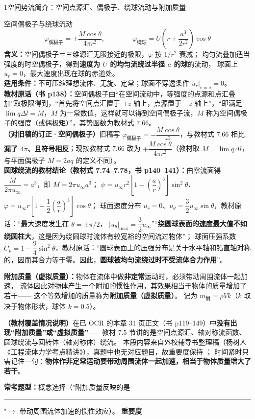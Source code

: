 \begin{kaodian}{1}{空间势流简介：空间点源汇、偶极子、绕球流动与附加质量}
\begin{gongshi}{空间偶极子与绕球流动}
\[ \varphi_{\text{偶极子}}=+\frac{M\cos\theta}{4\pi r^2},\qquad\qquad
   \varphi_{\text{绕球}}=U\left(r+\frac{a^3}{2r^2}\right)\cos\theta \]
\textbf{含义：}空间偶极子＝三维源汇无限接近的极限，$\varphi$ 按 $1/r^2$ 衰减；
均匀流叠加适当强度的时空偶极子，得到\textbf{速度为 $U$ 的均匀流绕过半径 $a$ 的球}的流动，
球面上 $u_r=0$，最大速度出现在球的赤道处。\\
\textbf{适用条件：}不可压缩理想流体、无旋、定常；球面不穿透条件 $u_r\big|_{r=a}=0$。\\
\textbf{教材原话（书 p138）：}空间偶极子由“在空间流动中，等强度的点源和点汇叠加”取极限得到，“首先将空间点汇置于 $+z$ 轴上，点源置于 $-z$ 轴上”，“即满足 $\lim q\Delta l=M$，$M$ 为一常数值，这样就可以得到空间偶极子流，$M$ 称为空间偶极子的强度（或偶极矩）”，其势函数为教材式 7.66。\\
\textbf{（对旧稿的订正·空间偶极子）}旧稿写 $\varphi_{\text{偶极子}}=-\dfrac{M\cos\theta}{r^2}$，与教材式 7.66 相比\textbf{漏了 $4\pi$、且符号相反}；现按教材式 7.66 改为 $+\dfrac{M\cos\theta}{4\pi r^2}$（教材取 $M=\lim q\Delta l$，与平面偶极子 $M=2aq$ 的定义不同）。\\
\textbf{圆球绕流的教材结论（教材式 7.74--7.78，书 p140--141）：}由零流面得 $\dfrac{M}{2\pi u_\infty}=a^3$，即 $M=2\pi u_\infty a^3$；
$\psi=u_\infty r^2\left[1-\left(\dfrac{a}{r}\right)^3\right]\sin^2\theta$、$\varphi=u_\infty r\left[1+\dfrac12\left(\dfrac{a}{r}\right)^3\right]\cos\theta$；
球面速度分布 $u_r=0$、$u_\theta=\dfrac32 u_\infty\sin\theta$，教材原话：“最大速度发生在 $\theta=\pm\pi/2$，
$|u_\theta|_{\max}=\dfrac32 u_\infty$”“\textbf{绕圆球表面的速度最大值不如绕圆柱大}，这是因为绕圆球时流体有较宽裕的空间流过物体”；
球面压强系数 $C_p=1-\dfrac94\sin^2\theta$，教材原话：“圆球表面上的压强分布是关于水平轴和铅直轴对称的，因而其合力等于零。因此，\textbf{圆球被均匀流绕过时不受流体合力作用}”。
\end{gongshi}

\noindent\textbf{附加质量（虚拟质量）：}物体在流体中做\textbf{非定常}运动时，必须带动周围流体一起加速，
流体因此对物体产生一个附加的惯性作用，其效果相当于物体的质量增加了若干——
这个等效增加的质量称为\textbf{附加质量（虚拟质量）}。
记为 $m_{\text{附}}=\rho V k$（$k$ 取决于物体形状，球体 $k=0.5$）。\\

\begin{tishi}
\textbf{（教材覆盖情况说明）}在已 OCR 的本章 31 页正文（书 p119--149）中\textbf{没有出现“附加质量”或“虚拟质量”}——教材 7.5 节讲的是空间点源汇、轴对称流函数、圆球绕流与回转体（轴对称体）绕流。
本段内容来自外校辅导书整理稿（杨树人《工程流体力学考点精讲》），真题中也无对应题目，故重要度保持 ；
时间紧时只需记住一句：\textbf{物体作非定常运动要带动周围流体一起加速，相当于物体质量增大了若干}。
\end{tishi}
\textbf{常考题型：}概念选择（"附加质量反映的是\rule{1.6cm}{0.4pt}"$\to$ 带动周围流体加速的惯性效应）。
\textbf{重要度 }\quad{}\quad{}
\end{kaodian}

